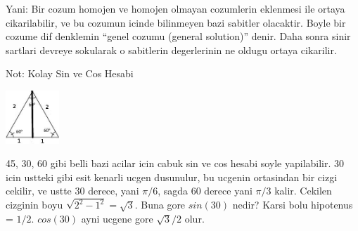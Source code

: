 \documentclass[12pt,fleqn]{article}
\begin{document}
Yani: Bir cozum homojen ve homojen olmayan cozumlerin eklenmesi ile ortaya
cikarilabilir, ve bu cozumun icinde bilinmeyen bazi sabitler
olacaktir. Boyle bir cozume dif denklemin ``genel cozumu (general
solution)'' denir. Daha sonra sinir sartlari devreye sokularak o sabitlerin
degerlerinin ne oldugu ortaya cikarilir.

Not: Kolay Sin ve Cos Hesabi

\includegraphics[height=2cm]{4_3.png}

45, 30, 60 gibi belli bazi acilar icin cabuk sin ve cos hesabi soyle
yapilabilir. 30 icin ustteki gibi esit kenarli ucgen dusunulur, bu ucgenin
ortasindan bir cizgi cekilir, ve ustte 30 derece, yani $\pi/6$, sagda 60
derece yani $\pi/3$ kalir. Cekilen cizginin boyu $\sqrt{2^2 - 1^2} =
\sqrt{3}$. Buna 
gore $sin(30)$ nedir? Karsi bolu hipotenus = $1/2$. $cos(30)$ ayni ucgene 
gore $\sqrt{3}/2$ olur.
\end{document}
